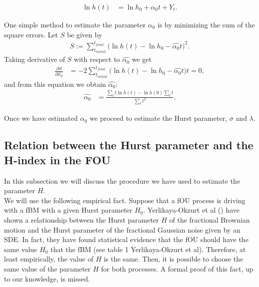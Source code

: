 \documentclass[smallextended]{svjour3}
\begin{document}
\begin{align}
\ln h(t)&=\ln h_0+\alpha_0t+Y_t. \label{mod-ln}
\end{align}

One simple method to estimate the parameter $\alpha_0$ is by minimizing the sum 
of the square errors.
Let $S$ be given by
\begin{align*}
S:= \sum_{t_{initial}}^{t_{final}} \Big( \ln h(t)-\ln h_0-\widehat{\alpha_0} t 
\Big)^2. %
\end{align*}
Taking derivative of $S$ with respect
to $\widehat{\alpha_0}$  we get
\begin{align*}
\frac{\partial S}{\partial \widehat{\alpha_0}}&= 
-2\sum_{t_{initial}}^{t_{final}} \Big( \ln h(t)-\ln h_0-\widehat{\alpha_0} t 
\Big) t =0, %
\end{align*}
and from this equation we obtain $\widehat{\alpha_0}$:
\begin{align}
\widehat{\alpha_0} &= \frac{\sum_{t} t\ln h(t) - \ln h(0)\sum_{t} t}{\sum_{t} 
t^2}. \label{alpha0}
\end{align}




Once we have estimated $\alpha_0$ we proceed to estimate the Hurst parameter, 
$\sigma$ and $\lambda$.





\subsection{Relation between the Hurst parameter and the H-index in the FOU}

In this subsection we will discuss the procedure we have used to estimate the 
parameter $H$.\\

We will use the following empirical fact. Suppose that a fOU process is driving 
with a fBM with a given
Hurst parameter $H_0$.  Yerlikaya-Okzurt et al (\cite{ye-etal})  have shown a 
relationship between the Hurst parameter $H$ of the fractional
Brownian motion and the Hurst parameter of the fractional Gaussian noise given 
by an SDE. In fact, they have found statistical evidence
that the fOU should have the same value $H_0$ that the fBM (see table 1 
Yerlikaya-Okzurt et al). Therefore, at least empirically,
the value of $H$ is the same. Then, it is possible to choose the same value of 
the
parameter $H$ for both processes.  A formal proof of this fact, up to our 
knowledge, is missed. \\
\end{document}
